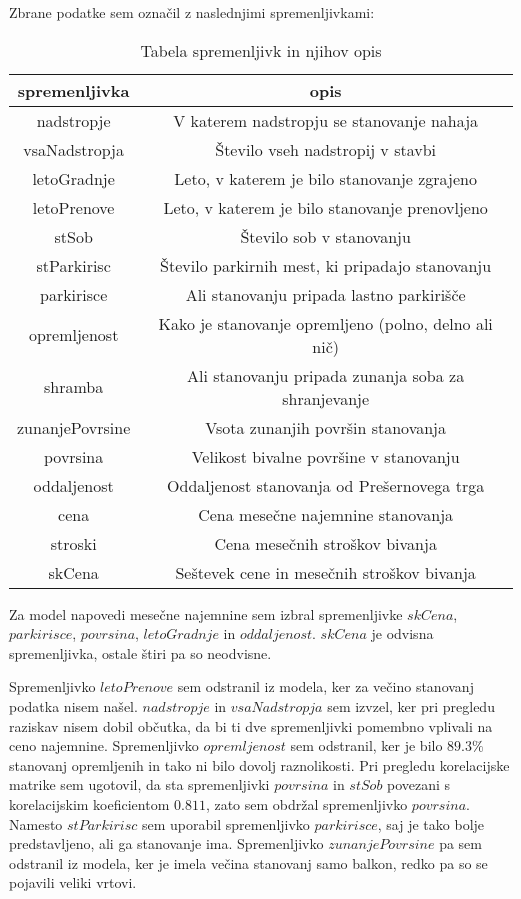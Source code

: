 \documentclass[a4paper, 12pt]{article}
\begin{document}
Zbrane podatke sem označil z naslednjimi spremenljivkami:
\begin{table}[H]
\begin{center}
\begin{tabular}{ c|c}
	spremenljivka & opis \\
	\hline
	\hline
	nadstropje & V katerem nadstropju se stanovanje nahaja \\
	\hline
	vsaNadstropja & Število vseh nadstropij v stavbi \\
	\hline
	letoGradnje & Leto, v katerem je bilo stanovanje zgrajeno \\
	\hline
	letoPrenove & Leto, v katerem je bilo stanovanje prenovljeno \\
	\hline
	stSob & Število sob v stanovanju \\
	\hline
	stParkirisc & Število parkirnih mest, ki pripadajo stanovanju \\
	\hline
	parkirisce & Ali stanovanju pripada lastno parkirišče \\
	\hline
	opremljenost & Kako je stanovanje opremljeno (polno, delno ali nič) \\
	\hline
	shramba & Ali stanovanju pripada zunanja soba za shranjevanje \\
	\hline
	zunanjePovrsine & Vsota zunanjih površin stanovanja \\
	\hline
	povrsina & Velikost bivalne površine v stanovanju \\
	\hline
	oddaljenost & Oddaljenost stanovanja od Prešernovega trga \\
	\hline
	cena & Cena mesečne najemnine stanovanja \\
	\hline
	stroski & Cena mesečnih stroškov bivanja \\
	\hline
	skCena & Seštevek cene in mesečnih stroškov bivanja \\
\end{tabular}
\caption{Tabela spremenljivk in njihov opis}
\label{table:1}
\end{center}
\end{table}

Za model napovedi mesečne najemnine sem izbral spremenljivke $ skCena $,
$ parkirisce $, $ povrsina $, $ letoGradnje $ in
$ oddaljenost $. $ skCena $ je odvisna spremenljivka, ostale štiri pa
so neodvisne.

Spremenljivko $ letoPrenove $ sem odstranil iz modela, ker za večino
stanovanj podatka nisem našel. $ nadstropje $ in $ vsaNadstropja $
sem izvzel, ker pri pregledu raziskav nisem dobil občutka, da bi ti dve
spremenljivki pomembno vplivali na ceno najemnine. Spremenljivko
$ opremljenost $ sem odstranil, ker je bilo $ 89.3\% $ stanovanj
opremljenih in tako ni bilo dovolj raznolikosti. Pri pregledu korelacijske
matrike sem ugotovil, da sta spremenljivki $ povrsina $ in
$ stSob $ povezani s korelacijskim koeficientom $ 0.811 $, zato sem obdržal
spremenljivko $ povrsina $. Namesto $ stParkirisc $ sem uporabil
spremenljivko $ parkirisce $, saj je tako bolje predstavljeno, ali ga
stanovanje ima. Spremenljivko $ zunanjePovrsine $ pa sem  odstranil iz
modela, ker je imela večina stanovanj samo balkon, redko pa so se pojavili
veliki vrtovi.
\end{document}
